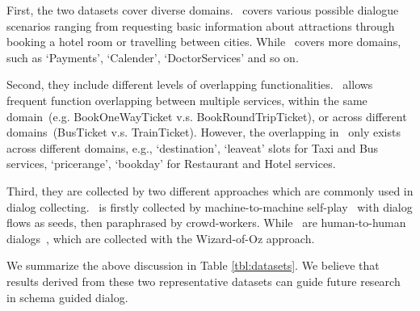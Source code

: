 First, the two datasets cover diverse domains. \multiwoz~covers
various possible dialogue scenarios ranging from requesting basic
information about attractions through booking a hotel room or
travelling between cities. While \sgdst~covers more domains, such as
`Payments', `Calender', `DoctorServices' and so on.

Second, they include different levels of overlapping
functionalities. \sgdst~allows frequent function overlapping between
multiple services, within the same domain~(e.g. BookOneWayTicket
v.s. BookRoundTripTicket), or across different domains~(BusTicket
v.s. TrainTicket). However, the overlapping in \multiwoz~only exists
across different domains, e.g., `destination', `leaveat' slots for
Taxi and Bus services, `pricerange', `bookday' for Restaurant and
Hotel services.

Third, they are collected by two different approaches which are
commonly used in dialog collecting. \sgdst~is firstly collected by
machine-to-machine self-play~\cite[M2M,][]{shah2018building} with
dialog flows as seeds, then paraphrased by crowd-workers. While
\multiwoz~are human-to-human
dialogs~\cite[H2H,][]{kelley1984iterative}, which are collected with
the Wizard-of-Oz approach.

We summarize the above discussion in Table \ref{tbl:datasets}.  We
believe that results derived from these two representative datasets can
guide future research in schema guided dialog.



